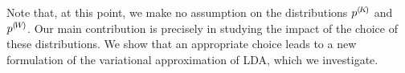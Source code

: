 Note that, at this point, we make no assumption on the distributions ${p}^{(\!{K}\!)}$ and ${p}^{(\!{W}\!)}$. Our main contribution is precisely in studying the impact of the choice of these distributions. We show that an appropriate choice leads to a new formulation of the variational approximation of LDA, which we investigate.